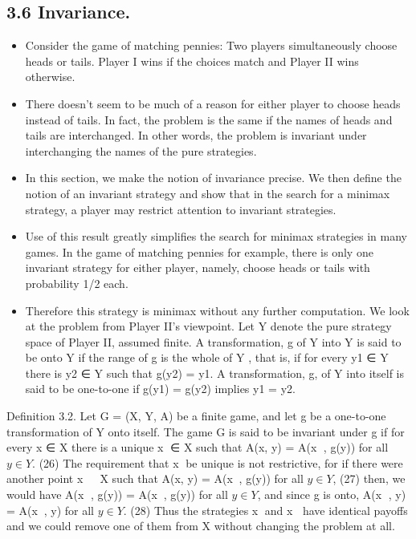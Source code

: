 \documentclass[]{report}
\begin{document}
\subsection{3.6 Invariance.} 
\begin{itemize}
\item Consider the game of matching pennies: Two players simultaneously
choose heads or tails. Player I wins if the choices match and Player II wins otherwise.
\item There doesn’t seem to be much of a reason for either player to choose heads instead of
tails. In fact, the problem is the same if the names of heads and tails are interchanged. In
other words, the problem is invariant under interchanging the names of the pure strategies.
\item 
In this section, we make the notion of invariance precise. We then define the notion of
an invariant strategy and show that in the search for a minimax strategy, a player may
restrict attention to invariant strategies. 
\item Use of this result greatly simplifies the search for
minimax strategies in many games. In the game of matching pennies for example, there is
only one invariant strategy for either player, namely, choose heads or tails with probability
1/2 each. 
\item 
Therefore this strategy is minimax without any further computation.
We look at the problem from Player II’s viewpoint. Let Y denote the pure strategy
space of Player II, assumed finite. A transformation, g of Y into Y is said to be onto Y
if the range of g is the whole of Y , that is, if for every y1 ∈ Y there is y2 ∈ Y such that
g(y2) = y1. A transformation, g, of Y into itself is said to be one-to-one if g(y1) = g(y2)
implies y1 = y2.
\end{itemize}
Definition 3.2. Let G = (X, Y, A) be a finite game, and let g be a one-to-one transformation
of Y onto itself. The game G is said to be invariant under g if for every x ∈ X
there is a unique x ∈ X such that
A(x, y) = A(x
, g(y)) for all $ y \in Y$. (26)
The requirement that x be unique is not restrictive, for if there were another point
x ∈ X such that
A(x, y) = A(x, g(y)) for all $ y \in Y$, (27)
then, we would have A(x
, g(y)) = A(x, g(y)) for all $ y \in Y$, and since g is onto,
A(x
, y) = A(x, y) for all $ y \in Y$. (28)
Thus the strategies x and x have identical payoffs and we could remove one of them from
X without changing the problem at all.
\end{document}
